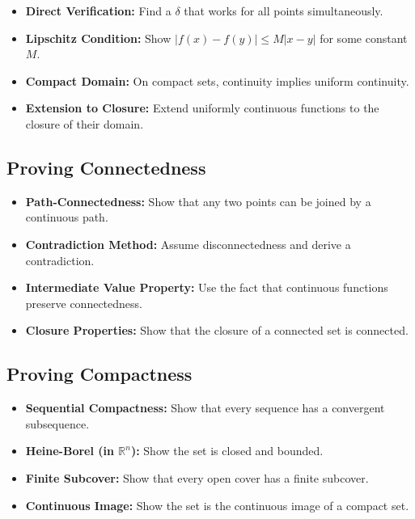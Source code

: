 \begin{itemize}
\item \textbf{Direct Verification:} Find a $\delta$ that works for all points simultaneously.

\item \textbf{Lipschitz Condition:} Show $|f(x) - f(y)| \leq M|x - y|$ for some constant $M$.

\item \textbf{Compact Domain:} On compact sets, continuity implies uniform continuity.

\item \textbf{Extension to Closure:} Extend uniformly continuous functions to the closure of their domain.
\end{itemize}

\subsection*{Proving Connectedness}

\begin{itemize}
\item \textbf{Path-Connectedness:} Show that any two points can be joined by a continuous path.

\item \textbf{Contradiction Method:} Assume disconnectedness and derive a contradiction.

\item \textbf{Intermediate Value Property:} Use the fact that continuous functions preserve connectedness.

\item \textbf{Closure Properties:} Show that the closure of a connected set is connected.
\end{itemize}

\subsection*{Proving Compactness}

\begin{itemize}
\item \textbf{Sequential Compactness:} Show that every sequence has a convergent subsequence.

\item \textbf{Heine-Borel (in $\mathbb{R}^n$):} Show the set is closed and bounded.

\item \textbf{Finite Subcover:} Show that every open cover has a finite subcover.

\item \textbf{Continuous Image:} Show the set is the continuous image of a compact set.
\end{itemize}

